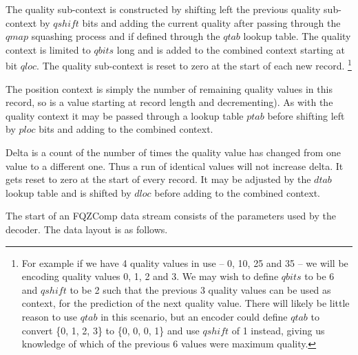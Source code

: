 \documentclass[a4paper]{article}
\begin{document}
The quality sub-context is constructed by shifting left the previous
quality sub-context by $qshift$ bits and adding the current quality
after passing through the $qmap$ squashing process and if defined
through the $qtab$ lookup table.  The quality context is limited to
$qbits$ long and is added to the combined context starting at bit
$qloc$.  The quality sub-context is reset to zero at the start of each
new record.
\footnote{For example if we have 4 quality values in use -- 0, 10, 25 and
35 -- we will be encoding quality values 0, 1, 2 and 3.  We may wish to
define $qbits$ to be 6 and $qshift$ to be 2 such that the previous 3
quality values can be used as context, for the prediction of the next
quality value.  There will likely be little reason to use $qtab$ in
this scenario, but an encoder could define $qtab$ to convert \{0, 1, 2, 3\}
to \{0, 0, 0, 1\} and use $qshift$ of 1 instead, giving us
knowledge of which of the previous 6 values were maximum quality.}

The position context is simply the number of remaining quality values
in this record, so is a value starting at record length and
decrementing).  As with the quality context it may be passed through a
lookup table $ptab$ before shifting left by $ploc$ bits and adding to
the combined context.

Delta is a count of the number of times the quality value has changed
from one value to a different one.  Thus a run of identical values
will not increase delta.  It gets reset to zero at the start of every
record.  It may be adjusted by the $dtab$ lookup table and is shifted
by $dloc$ before adding to the combined context.

The start of an FQZComp data stream consists of the parameters used by
the decoder. The data layout is as follows.
\end{document}

